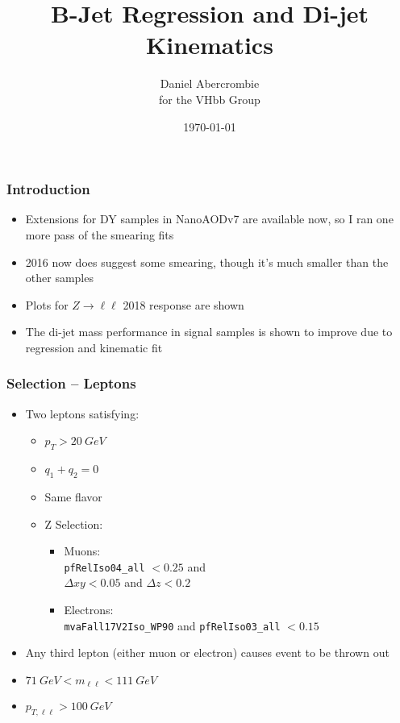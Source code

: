 \documentclass{beamer}
\author[D. Abercrombie]{
  Daniel Abercrombie \\
  for the VHbb Group
}
\title{\bf \sffamily B-Jet Regression and Di-jet Kinematics}
\date{\today}
\begin{document}
\begin{frame}
  \titlepage
\end{frame}

\begin{frame}
  \frametitle{Introduction}

  \begin{itemize}
  \item Extensions for DY samples in NanoAODv7 are available now,
    so I ran one more pass of the smearing fits
  \item 2016 now does suggest some smearing, though it's much smaller than the other samples
  \end{itemize}
  \begin{itemize}
  \item Plots for $Z\rightarrow \ell\ell$ 2018 response are shown
  \item The di-jet mass performance in signal samples is shown to improve due to regression
    and kinematic fit
  \end{itemize}

\end{frame}

\begin{frame}
  \frametitle{Selection -- Leptons}

  \begin{itemize}
  \item Two leptons satisfying:
    \begin{itemize}
    \item $p_T > \SI{20}{GeV}$
    \item $q_1 + q_2 = 0$
    \item Same flavor
    \item Z Selection:
      \begin{itemize}
      \item Muons: \\
        \texttt{pfRelIso04\_all} $< 0.25$ and \\
        $\Delta xy < 0.05$ and $\Delta z < 0.2$
      \item Electrons: \\
        \texttt{mvaFall17V2Iso\_WP90} and \texttt{pfRelIso03\_all} $< 0.15$
      \end{itemize}
    \end{itemize}
  \item Any third lepton (either muon or electron) causes event to be thrown out
  \item $\SI{71}{GeV} < m_{\ell\ell} < \SI{111}{GeV}$
  \item $p_{T,\ell\ell} > \SI{100}{GeV}$
  \end{itemize}

\end{frame}
\end{document}
